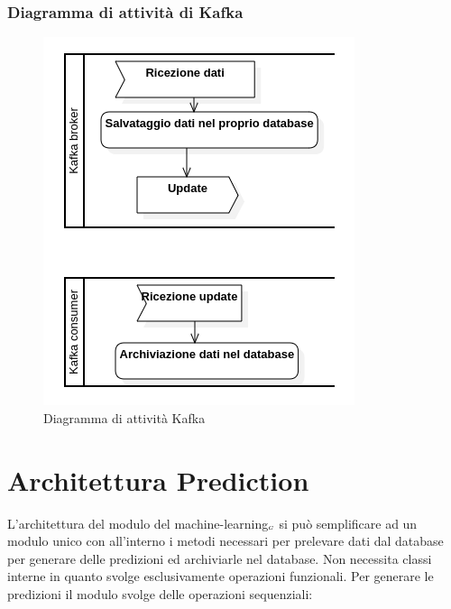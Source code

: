 \subsubsection{Diagramma di attività di Kafka}\label{DiagrammaDiKafka}
\begin{center}
	\begin{figure}[H]
		\centering\includegraphics[scale=0.8]
    {../immagini/diag_PB/kafka.png}
		\caption{Diagramma di attività Kafka}
	\end{figure}
\end{center}


\section{Architettura Prediction}\label{ArchitetturaDelProdottoPrediction}
L'architettura del modulo del machine-learning$_{\scaleto{G}{3pt}}$ si può semplificare ad un modulo unico con all'interno i metodi necessari per prelevare dati dal database per generare delle predizioni ed archiviarle nel database.
Non necessita classi interne in quanto svolge esclusivamente operazioni funzionali. Per generare le predizioni il modulo svolge delle operazioni sequenziali:
